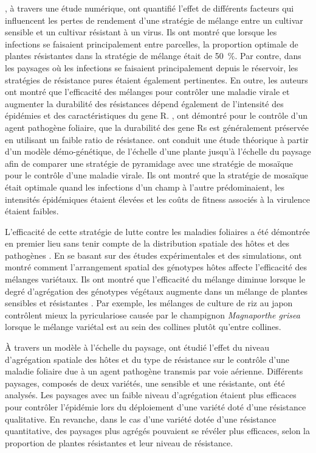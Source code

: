 	\citet{Fabre2012}, à travers une étude numérique,  ont quantifié l'effet de différents  facteurs qui influencent les pertes de rendement d'une stratégie de mélange entre un cultivar sensible et un cultivar résistant à un virus. Ils ont montré que lorsque les  infections se faisaient principalement entre parcelles, la proportion optimale de plantes résistantes dans la stratégie  de mélange était de 50~\%. Par contre, dans les paysages où les infections se faisaient principalement depuis le réservoir, les stratégies de résistance pures étaient également pertinentes. En outre, les auteurs ont montré que l'efficacité des mélanges pour contrôler une maladie virale et augmenter la durabilité des résistances  dépend également de l’intensité
des épidémies et des caractéristiques du \gls{gene R}.  \citet{vandenBosch2003}, ont démontré 
pour le contrôle d'un agent pathogène foliaire, que la durabilité des \glspl{gene R} est généralement préservée en utilisant un faible ratio de  résistance.  \citet{Djidjou-Demasse2017} ont conduit une étude théorique à partir d'un modèle démo-génétique, de l'échelle d'une plante jusqu'à l'échelle du paysage afin de comparer une stratégie de pyramidage  avec une stratégie de mosaïque pour le contrôle d'une maladie virale. Ils ont montré que la stratégie de mosaïque était optimale  quand  les infections d'un champ à l'autre prédominaient, les intensités épidémiques  étaient élevées et les coûts de fitness associés à la virulence étaient faibles.
	
	L'efficacité de cette stratégie de lutte contre les maladies foliaires a été démontrée en premier lieu  sans tenir compte de la distribution spatiale des hôtes et des pathogènes \citep{Browning1969}.
En se basant sur  des études expérimentales et des simulations, \citet{Mundt1985} ont montré comment l'arrangement spatial des génotypes hôtes affecte l'efficacité  des mélanges variétaux.
Ils ont montré que l'efficacité du mélange diminue lorsque le degré d'agrégation des génotypes végétaux augmente dans un mélange de plantes sensibles et résistantes  \citep{Mundt1986, Mundt1986b}. Par exemple, les mélanges de culture de riz au japon contrôlent  mieux la pyriculariose causée par le champignon \textit{Magnaporthe grisea} lorsque le mélange variétal est au sein des collines  plutôt qu'entre collines.

	 À travers un modèle à l'échelle du paysage, \citet{Papaix2014} ont étudié l’effet du niveau d'agrégation spatiale des hôtes et du type de résistance sur le contrôle d’une maladie foliaire due
à un agent pathogène transmis par voie aérienne. 
Différents paysages, composés de deux variétés, une
sensible et une résistante, ont été analysés. Les paysages avec un faible niveau d'agrégation étaient plus efficaces  pour contrôler l'épidémie lors du déploiement
d’une variété doté d'une résistance qualitative. En revanche, dans le cas  d'une variété dotée d'une résistance
quantitative,  des paysages plus agrégés pouvaient se révéler plus efficaces, selon la proportion de plantes résistantes et leur niveau de résistance.


